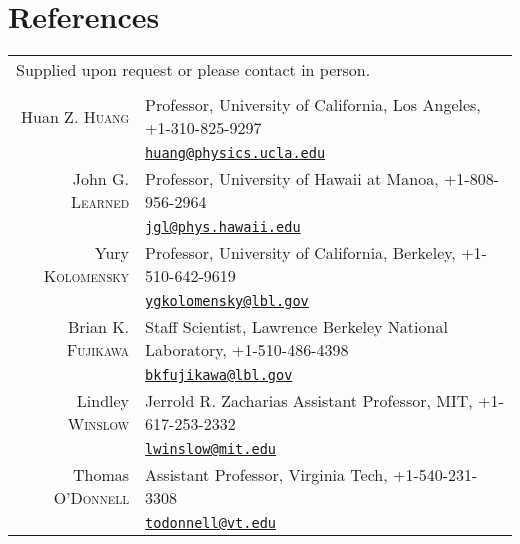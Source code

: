 \documentclass[10pt]{article} %
\begin{document}

\clearpage
\section{References}

\noindent\begin{tabular}{rp{12cm}}
\multicolumn{2}{l}{\footnotesize{Supplied upon request or please contact in
	person.}}\\
\multicolumn{2}{c}{}\\
Huan Z. \textsc{Huang} & Professor, University of California, Los Angeles, +1-310-825-9297\\
& \href{mailto:huang@physics.ucla.edu}{\nolinkurl{huang@physics.ucla.edu}}\\
John G. \textsc{Learned} & Professor, University of Hawaii at Manoa, +1-808-956-2964\\
& \href{mailto:jgl@phys.hawaii.edu}{\nolinkurl{jgl@phys.hawaii.edu}}\\
Yury \textsc{Kolomensky} & Professor, University of California, Berkeley, +1-510-642-9619\\
& \href{mailto:ygkolomensky@lbl.gov}{\nolinkurl{ygkolomensky@lbl.gov}}\\
Brian K. \textsc{Fujikawa} & Staff Scientist, Lawrence Berkeley National Laboratory, +1-510-486-4398\\
& \href{mailto:bkfujikawa@lbl.gov}{\nolinkurl{bkfujikawa@lbl.gov}}\\
Lindley \textsc{Winslow} & Jerrold R. Zacharias Assistant Professor, MIT, +1-617-253-2332\\
& \href{mailto:lwinslow@mit.edu}{\nolinkurl{lwinslow@mit.edu}}\\ 
Thomas \textsc{O'Donnell} & Assistant Professor, Virginia Tech, +1-540-231-3308\\
& \href{mailto:todonnell@vt.edu}{\nolinkurl{todonnell@vt.edu}}\\

%
%

\end{tabular}

\end{document}
